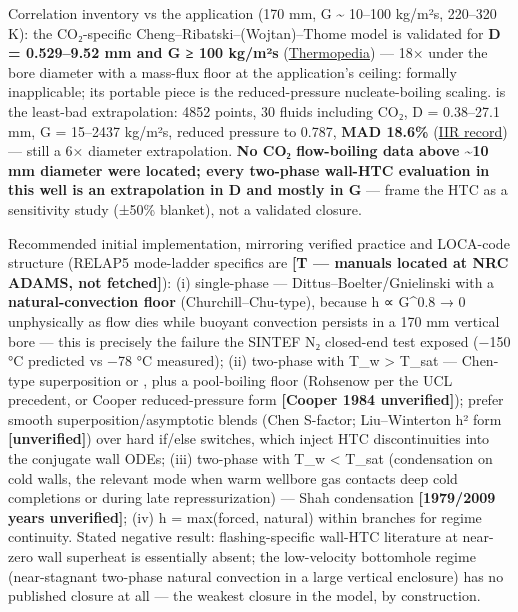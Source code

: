 Correlation inventory vs the application (170 mm, G \textasciitilde{}
10--100 kg/m²s, 220--320 K): the CO₂-specific
Cheng--Ribatski--(Wojtan)--Thome model is validated for \textbf{D =
0.529--9.52 mm and G ≥ 100 kg/m²s}
(\href{https://thermopedia.com/content/10372/}{Thermopedia}) --- 18×
under the bore diameter with a mass-flux floor at the application's
ceiling: formally inapplicable; its portable piece is the
reduced-pressure nucleate-boiling scaling. \textbf{\citet{shah2017}} is the least-bad extrapolation: 4852
points, 30 fluids including CO₂, D = 0.38--27.1 mm, G = 15--2437 kg/m²s,
reduced pressure to 0.787, \textbf{MAD 18.6\%}
(\href{https://iifiir.org/en/fridoc/unified-correlation-for-heat-transfer-during-boiling-in-plain-140363}{IIR
record}) --- still a 6× diameter extrapolation. \textbf{No CO₂
flow-boiling data above \textasciitilde10 mm diameter were located;
every two-phase wall-HTC evaluation in this well is an extrapolation in
D and mostly in G} --- frame the HTC as a sensitivity study (±50\%
blanket), not a validated closure.

Recommended initial implementation, mirroring verified practice and
LOCA-code structure (RELAP5 mode-ladder specifics are \textbf{{[}T ---
manuals located at NRC ADAMS, not fetched{]}}): (i) single-phase ---
Dittus--Boelter/Gnielinski with a \textbf{natural-convection floor}
(Churchill--Chu-type), because h ∝ G\^{}0.8 → 0 unphysically as flow
dies while buoyant convection persists in a 170 mm vertical bore ---
this is precisely the failure the SINTEF N₂ closed-end test exposed
(−150 °C predicted vs −78 °C measured); (ii) two-phase with T\_w
\textgreater{} T\_sat --- Chen-type superposition or \citet{shah2017}, plus a
pool-boiling floor (Rohsenow per the UCL precedent, or Cooper
reduced-pressure form \textbf{{[}Cooper 1984 unverified{]}}); prefer
smooth superposition/asymptotic blends (Chen S-factor; Liu--Winterton h²
form \textbf{{[}unverified{]}}) over hard if/else switches, which inject
HTC discontinuities into the conjugate wall ODEs; (iii) two-phase with
T\_w \textless{} T\_sat (condensation on cold walls, the relevant mode
when warm wellbore gas contacts deep cold completions or during late
repressurization) --- Shah condensation \textbf{{[}1979/2009 years
unverified{]}}; (iv) h = max(forced, natural) within branches for regime
continuity. Stated negative result: flashing-specific wall-HTC
literature at near-zero wall superheat is essentially absent; the
low-velocity bottomhole regime (near-stagnant two-phase natural
convection in a large vertical enclosure) has no published closure at
all --- the weakest closure in the model, by construction.

